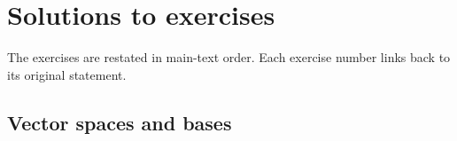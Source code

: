 \chapter{Solutions to exercises}
\label{ch:appendix:exercise-solutions}

The exercises are restated in main-text order. Each exercise number links
back to its original statement.

\section{Vector spaces and bases}

\begin{restatedproblem}
  
\end{restatedproblem}


\begin{restatedproblem}
  
\end{restatedproblem}


\begin{restatedproblem}
  
\end{restatedproblem}


\begin{restatedproblem}
  
\end{restatedproblem}


\begin{restatedproblem}
  
\end{restatedproblem}


\begin{restatedproblem}
  
\end{restatedproblem}


